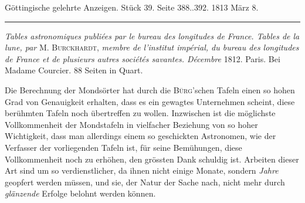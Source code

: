 \clearpage
{}
\begin{center}\small Göttingische gelehrte Anzeigen. Stück 39. Seite 388..392. 1813 März 8.\\[3pt]\rule{.72\linewidth}{.3pt}\end{center}

\emph{Tables astronomiques publiées par le bureau des longitudes de France. Tables de la lune, par} M. \textsc{Burckhardt}, \emph{membre de l'institut impérial, du bureau des longitudes de France et de plusieurs autres sociétés savantes. Décembre} 1812. Paris. Bei Madame Courcier. 88 Seiten in Quart.

Die Berechnung der Mondsörter hat durch die \textsc{Bürg}'schen Tafeln einen so hohen Grad von Genauigkeit erhalten, dass es ein gewagtes Unternehmen scheint, diese berühmten Tafeln noch übertreffen zu wollen. Inzwischen ist die möglichste Vollkommenheit der Mondstafeln in vielfacher Beziehung von so hoher Wichtigkeit, dass man allerdings einem so geschickten Astronomen, wie der Verfasser der vorliegenden Tafeln ist, für seine Bemühungen, diese Vollkommenheit noch zu erhöhen, den grössten Dank schuldig ist. Arbeiten dieser Art sind um so verdienstlicher, da ihnen nicht einige Monate, sondern \emph{Jahre} geopfert werden müssen, und sie, der Natur der Sache nach, nicht mehr durch \emph{glänzende} Erfolge belohnt werden können.

